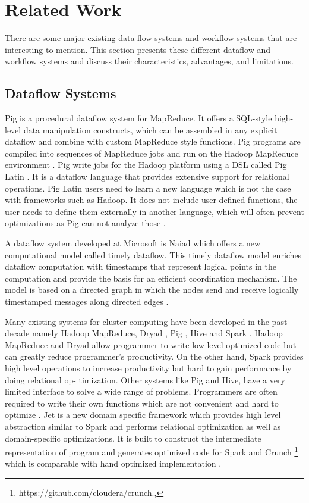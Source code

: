 \section{Related Work}
There are some major existing data flow systems and workflow systems that are interesting to mention. This section presents these different dataflow and workflow systems and discuss their characteristics, advantages, and limitations. 

\subsection{Dataflow Systems}
Pig is a procedural dataflow system for MapReduce. It offers a SQL-style high-level data manipulation constructs, which can be assembled in any explicit dataflow and combine with custom MapReduce style functions. Pig programs are compiled into sequences of MapReduce jobs and run on the Hadoop MapReduce environment \cite{gates2009building}. Pig write jobs for the Hadoop platform using a DSL called Pig Latin \cite{olston2008pig}. It is a dataflow language that provides extensive support for relational operations. Pig Latin users need to learn a new language which is not the case with frameworks such as Hadoop. It does not include user defined functions, the user needs to define them externally in another language, which will often prevent optimizations as Pig can not analyze those \cite{ackermann2012jet}. 

A dataflow system developed at Microsoft is Naiad \cite{murray2013naiad} which offers a new computational model called timely dataflow. This timely dataflow model enriches dataflow computation with timestamps that represent logical points in the computation and provide the basis for an efficient coordination mechanism. The model is based on a directed graph in which the nodes send and receive logically timestamped messages along directed edges \cite{murray2013naiad}. 

Many existing systems for cluster computing have been developed in the past decade namely Hadoop MapReduce, Dryad \cite{isard2007dryad}, Pig \cite{olston2008pig}, Hive \cite{thusoo2010hive} and Spark \cite{zaharia2010spark}. Hadoop MapReduce and Dryad allow programmer to write low level optimized code but can greatly reduce programmer’s productivity. On the other hand, Spark provides high level operations to increase productivity but hard to gain performance by doing relational op-
timization. Other systems like Pig and Hive, have a very limited interface to solve a wide range of problems. Programmers are often required to write their own functions which are not convenient and hard to optimize \cite{ackermann2012jet}. Jet is a new domain specific framework which provides high level abstraction similar to Spark and performs relational optimization as well as domain-specific optimizations. It is built to construct the intermediate representation of program and generates optimized code for Spark and Crunch \footnote{https://github.com/cloudera/crunch.,} which is comparable with hand optimized implementation \cite{ackermann2012jet}. 

